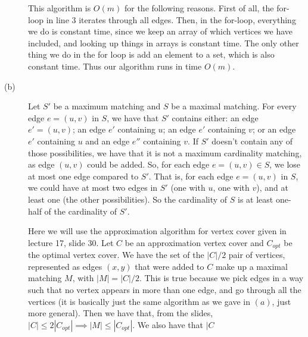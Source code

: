 \documentclass{article}
\begin{document}
\begin{description}
        This algorithm is $O(m)$ for the following reasons. First of all, the
        for-loop in line 3 iterates through all edges. Then, in
        the for-loop, everything we do is constant time, since we keep an array
        of which vertices we have included, and looking up things in arrays is
        constant time. The only other thing we do in the for loop is add an
        element to a set, which is also constant time. Thus our algorithm runs
        in time $O(m)$.
    \item[(b)]
        Let $S'$ be a maximum matching and $S$ be a maximal matching.
        For every edge $e = (u,v)$ in $S$, we have that $S'$ contains either: an
        edge $e' = (u,v)$; an edge $e'$ containing $u$; an edge $e'$ containing
        $v$; or an edge $e'$ containing $u$ and an edge $e''$ containing $v$. If
        $S'$ doesn't contain any of those possibilities, we have that it is not
        a maximum cardinality matching, as edge $(u,v)$ could be added.
        So, for each edge $e = (u,v) \in S$,
        we lose at most one edge compared to $S'$. That is, for each edge
        $e = (u,v)$ in $S$, we could have at most two edges in $S'$ (one with
        $u$, one with $v$), and at
        least one (the other possibilities). So the cardinality of $S$ is at least
        one-half of the cardinality of $S'$.

        Here we will use the approximation algorithm for vertex cover given in
        lecture 17, slide 30. Let $C$ be an approximation vertex cover and
        $C_{opt}$ be the optimal vertex cover. We have
        the set of the $|C|/2$ pair of vertices, represented as edges $(x,y)$
        that were added to $C$ make up a maximal matching $M$, with $|M| =
        |C|/2$. This is true because we pick edges in a way such that no vertex
        appears in more than one edge, and go through all the vertices (it is
        basically just the same algorithm as we gave in $(a)$, just more
        general). Then we have that, from the slides, $|C| \leq 2|C_{opt}|
        \implies |M| \leq |C_{opt}|$. We also have that $|C$
\end{description}
\newpage

\end{document}
